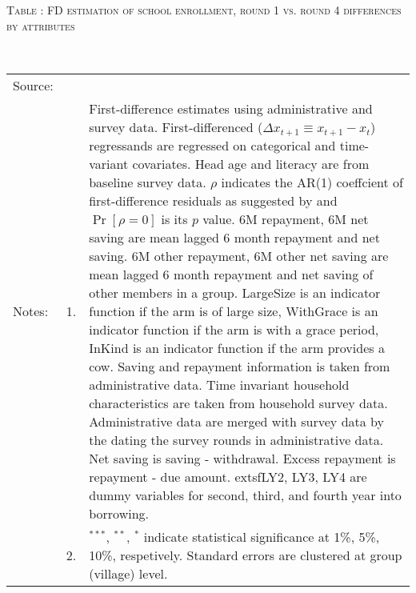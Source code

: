 \hspace{-1cm}\begin{minipage}[t]{14cm}
\hfil\textsc{\normalsize Table \thetable: FD estimation of school enrollment, round 1 vs. round 4 differences by attributes\label{tab FD enroll5 attributes original HH}}\\
\setlength{\tabcolsep}{1pt}
\setlength{\baselineskip}{8pt}
\renewcommand{\arraystretch}{.55}
\hfil{}\\
\renewcommand{\arraystretch}{.8}
\setlength{\tabcolsep}{1pt}
\begin{tabular}{>{\hfill\scriptsize}p{1cm}<{}>{\hfill\scriptsize}p{.25cm}<{}>{\scriptsize}p{12cm}<{\hfill}}
Source:& \multicolumn{2}{l}{\scriptsize Estimated with GUK administrative and survey data.}\\
Notes: & 1. & First-difference estimates using administrative and survey data. First-differenced ($\Delta x_{t+1}\equiv x_{t+1} - x_{t}$) regressands are regressed on categorical and time-variant covariates. Head age and literacy are from baseline survey data. $\rho$ indicates the AR(1) coeffcient of first-difference residuals as suggested by \citet[][10.71]{Wooldridge2010} and $\Pr[\rho=0]$ is its $p$ value. \textsf{6M repayment, 6M net saving} are mean lagged 6 month repayment and net saving. \textsf{6M other repayment, 6M other net saving} are mean lagged 6 month repayment and net saving of other members in a group. \textsf{LargeSize} is an indicator function if the arm is of large size, \textsf{WithGrace} is an indicator function if the arm is with a grace period, \textsf{InKind} is an indicator function if the arm provides a cow. Saving and repayment information is taken from administrative data. Time invariant household characteristics are taken from household survey data. Administrative data are merged with survey data by the dating the survey rounds in administrative data. Net saving is saving - withdrawal. Excess repayment is repayment - due amount. 	extsf{LY2, LY3, LY4} are dummy variables for second, third, and fourth year into borrowing.\\
& 2. & ${}^{***}$, ${}^{**}$, ${}^{*}$ indicate statistical significance at 1\%, 5\%, 10\%, respetively. Standard errors are clustered at group (village) level.
\end{tabular}
\end{minipage}

